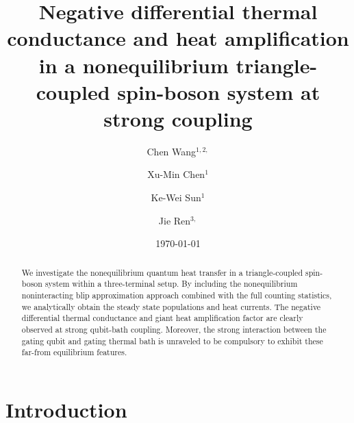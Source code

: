 \documentclass[twocolumn,preprintnumbers,amsmath,amssymb]{revtex4}
\begin{document}
\title{Negative differential thermal conductance and heat amplification in a nonequilibrium triangle-coupled spin-boson system at strong coupling}
\author{Chen Wang$^{1,2,}$}
\author{Xu-Min Chen$^{1}$}
\author{Ke-Wei Sun$^{1}$}
\author{Jie Ren$^{3,}$}
\address{
$^{1}$Department of Physics, Hangzhou Dianzi University, Hangzhou 310018, Zhejiang, P. R. China\\
$^{2}$Department of Physics, Zhejiang Normal University, Jinhua 321004, Zhejiang , P. R. China\\
$^{3}$Center for Phononics and Thermal Energy Science, China-EU Joint Center for Nanophononics, \\
Shanghai Key Laboratory of Special Artificial Microstructure Materials and Technology,  \\
School of Physics Sciences and Engineering, Tongji University, Shanghai 200092, China
}

\date{\today}

\begin{abstract}
We investigate the nonequilibrium quantum heat transfer in a triangle-coupled spin-boson system within a three-terminal setup.
By including the nonequilibrium noninteracting blip approximation approach combined with the full counting statistics, we analytically obtain the steady state populations and heat currents.
The negative differential thermal conductance and giant heat amplification factor are clearly observed at strong qubit-bath coupling.
Moreover, the strong interaction between the gating qubit and gating thermal bath is unraveled to be compulsory to exhibit these far-from equilibrium features.
\end{abstract}




\maketitle



\section{Introduction}
\end{document}

